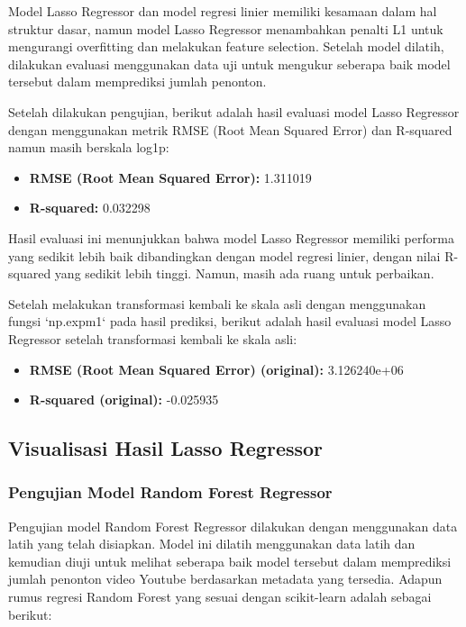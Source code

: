 Model Lasso Regressor dan model regresi linier memiliki kesamaan dalam hal struktur dasar, namun model Lasso Regressor menambahkan penalti L1 untuk mengurangi overfitting dan melakukan feature selection. Setelah model dilatih, dilakukan evaluasi menggunakan data uji untuk mengukur seberapa baik model tersebut dalam memprediksi jumlah penonton.

Setelah dilakukan pengujian, berikut adalah hasil evaluasi model Lasso Regressor dengan menggunakan metrik RMSE (Root Mean Squared Error) dan R-squared namun masih berskala log1p:

\begin{itemize}
    \item \textbf{RMSE (Root Mean Squared Error):} 1.311019
    \item \textbf{R-squared:} 0.032298
\end{itemize}

Hasil evaluasi ini menunjukkan bahwa model Lasso Regressor memiliki performa yang sedikit lebih baik dibandingkan dengan model regresi linier, dengan nilai R-squared yang sedikit lebih tinggi. Namun, masih ada ruang untuk perbaikan.

Setelah melakukan transformasi kembali ke skala asli dengan menggunakan fungsi `np.expm1` pada hasil prediksi, berikut adalah hasil evaluasi model Lasso Regressor setelah transformasi kembali ke skala asli:
\begin{itemize}
    \item \textbf{RMSE (Root Mean Squared Error) (original):} 3.126240e+06
    \item \textbf{R-squared (original):} -0.025935
\end{itemize}

\subsection{Visualisasi Hasil Lasso Regressor}
\lipsum[5-6]

\subsubsection{Pengujian Model Random Forest Regressor}
Pengujian model Random Forest Regressor dilakukan dengan menggunakan data latih yang telah disiapkan. Model ini dilatih menggunakan data latih dan kemudian diuji untuk melihat seberapa baik model tersebut dalam memprediksi jumlah penonton video Youtube berdasarkan metadata yang tersedia.
Adapun rumus regresi Random Forest yang sesuai dengan scikit-learn adalah sebagai berikut:

